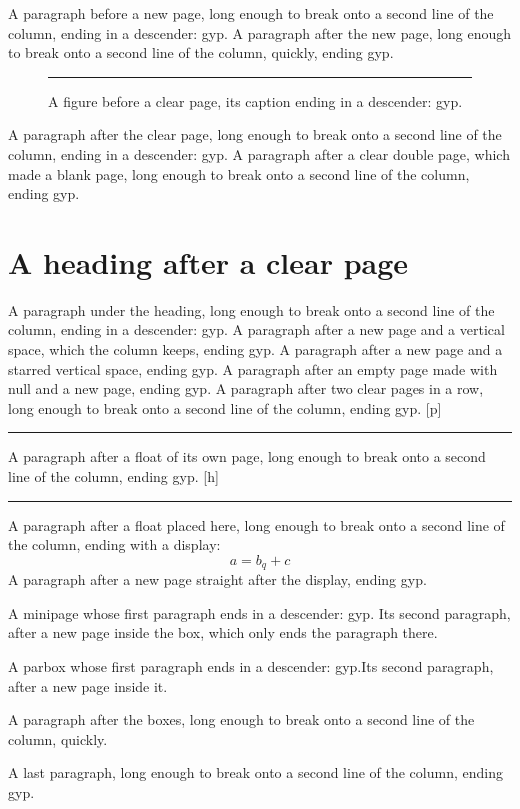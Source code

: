 \documentclass[twoside]{article}
\makeatletter
\newenvironment{pagefloat}{\@float{figure}[p]}{\end@float}
\newenvironment{herefloat}{\@float{figure}[h]}{\end@float}
\makeatother
\begin{document}
A paragraph before a new page, long enough to break onto a second line of the
column, ending in a descender: gyp.
\newpage
A paragraph after the new page, long enough to break onto a second line of the
column, quickly, ending gyp.
\begin{figure}[t]
  \centering
  \rule{3cm}{1cm}
  \caption{A figure before a clear page, its caption ending in a descender: gyp.}
\end{figure}
\clearpage
A paragraph after the clear page, long enough to break onto a second line of
the column, ending in a descender: gyp.
\cleardoublepage
A paragraph after a clear double page, which made a blank page, long enough to
break onto a second line of the column, ending gyp.
\clearpage
\section{A heading after a clear page}
A paragraph under the heading, long enough to break onto a second line of the
column, ending in a descender: gyp.
\newpage
\vspace{20pt}
A paragraph after a new page and a vertical space, which the column keeps,
ending gyp.
\newpage
\vspace*{20pt}
A paragraph after a new page and a starred vertical space, ending gyp.
\null\newpage
A paragraph after an empty page made with null and a new page, ending gyp.
\clearpage
\clearpage
A paragraph after two clear pages in a row, long enough to break onto a second
line of the column, ending gyp.
\begin{pagefloat}
  \centering\rule{3cm}{1cm}
\end{pagefloat}
A paragraph after a float of its own page, long enough to break onto a second
line of the column, ending gyp.
\begin{herefloat}
  \centering\rule{3cm}{1cm}
\end{herefloat}
A paragraph after a float placed here, long enough to break onto a second line
of the column, ending with a display:
\[ a = b_q + c \]
\newpage
A paragraph after a new page straight after the display, ending gyp.

\noindent\begin{minipage}{200pt}
A minipage whose first paragraph ends in a descender: gyp.
\newpage
Its second paragraph, after a new page inside the box, which only ends the
paragraph there.
\end{minipage}

\noindent\parbox{200pt}{A parbox whose first paragraph ends in a
  descender: gyp.\newpage Its second paragraph, after a new page inside it.}

A paragraph after the boxes, long enough to break onto a second line of the
column, quickly.

A last paragraph, long enough to break onto a second line of the
column, ending gyp.
\end{document}
